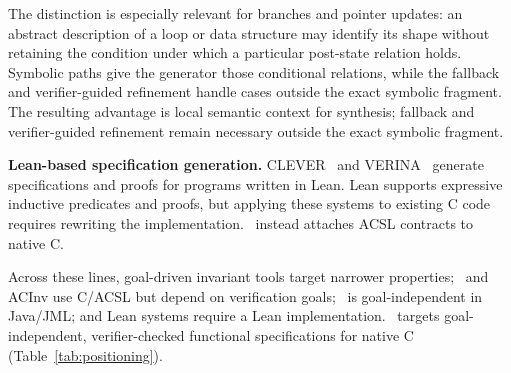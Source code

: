 The distinction is especially relevant for branches and pointer updates:
an abstract description of a loop or data structure may identify its shape
without retaining the condition under which a particular post-state relation
holds. Symbolic paths give the generator those conditional relations, while
the fallback and verifier-guided refinement handle cases outside the exact
symbolic fragment. The resulting advantage is local semantic context for synthesis; fallback and
verifier-guided refinement remain necessary outside the exact symbolic fragment.

\smallskip
\noindent\textbf{Lean-based specification generation.}
CLEVER~\cite{thakur2025clever} and VERINA~\cite{ye2026verina} generate specifications and proofs for programs written in Lean. Lean supports expressive inductive predicates and proofs, but applying these systems to existing C code requires rewriting the implementation. \toolname\ instead attaches ACSL contracts to native C.

\smallskip
\noindent Across these lines, goal-driven invariant tools target narrower properties; \autospec\ and ACInv use C/ACSL but depend on verification goals; \specgen\ is goal-independent in Java/JML; and Lean systems require a Lean implementation. \toolname\ targets goal-independent, verifier-checked functional specifications for native C (Table~\ref{tab:positioning}).
